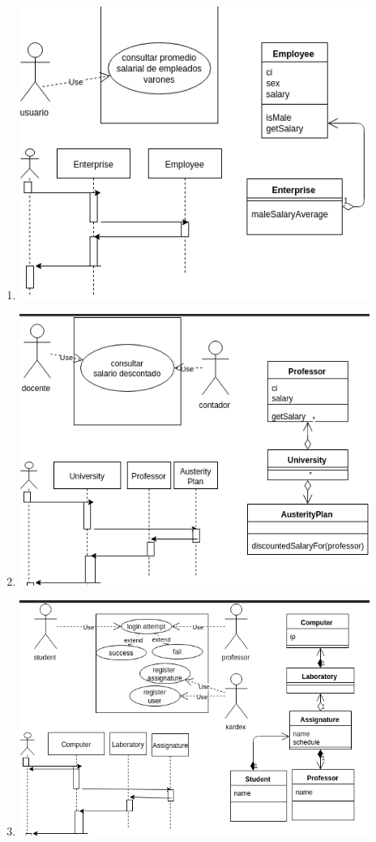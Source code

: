 \begin{enumerate}
\item \includegraphics[width=0.9\textwidth]{img/2-a.png}
\item \includegraphics[width=0.9\textwidth]{img/2-b.png}
\item \includegraphics[width=0.9\textwidth]{img/2-c.png}
\end{enumerate}
